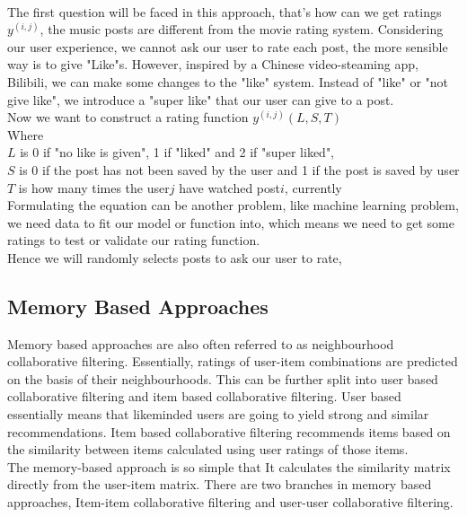 \\The first question will be faced in this approach, that's how can we get ratings $y^{(i,j)}$, the music posts are different from the movie rating system. Considering our user experience,
we cannot ask our user to rate each post, the more sensible way is to give "Like"s. However, inspired by a Chinese video-steaming app, Bilibili, we can make some changes to the "like" system. 
Instead of "like" or "not give like", we introduce a "super like" that our user can give to a post.
\\Now we want to construct a rating function $y^{(i,j)}(L,S,T)$
\\Where 
\\$L$ is 0 if "no like is given", 1 if "liked" and 2 if "super liked", 
\\$S$ is 0 if the post has not been saved by the user and 1 if the post is saved by user
\\$T$ is how many times the user$j$ have watched post$i$, currently 
\\Formulating the equation can be another problem, like machine learning problem, we need data to fit our model or function into, which means we need to get some ratings to test or validate our rating function.
\\Hence we will randomly selects posts to ask our user to rate, 



\subsection{Memory Based Approaches}
Memory based approaches are also often referred to as neighbourhood collaborative filtering. Essentially, ratings of user-item combinations are predicted on the basis of their neighbourhoods. 
This can be further split into user based collaborative filtering and item based collaborative filtering. 
User based essentially means that likeminded users are going to yield strong and similar recommendations. Item based collaborative filtering recommends items based on the similarity between items calculated using user ratings of those items.
\\The memory-based approach is so simple that It calculates the similarity matrix directly from the user-item matrix. There are two branches in memory based approaches, Item-item collaborative filtering and user-user collaborative filtering.

